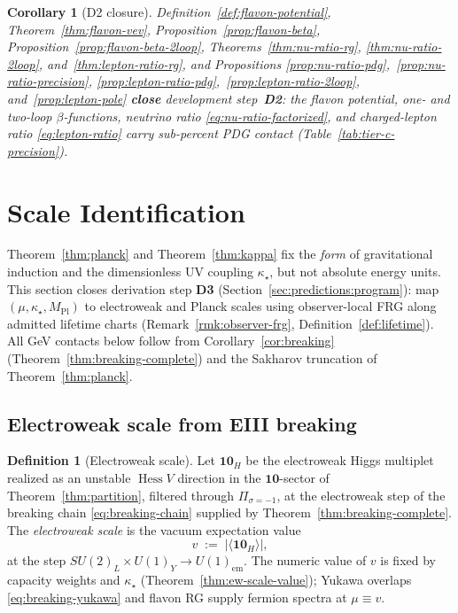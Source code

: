 \documentclass[aps,prd,onecolumn,amsmath,amssymb,nofootinbib,11pt]{revtex4-2}
\numberwithin{equation}{section}
\theoremstyle{plain}
\newtheorem{corollary}[theorem]{Corollary}
\theoremstyle{definition}
\newtheorem{definition}[theorem]{Definition}
\theoremstyle{remark}
\newcommand{\MPl}{M_{\mathrm{Pl}}}
\newcommand{\Hess}{\operatorname{Hess}}
\begin{document}
\begin{corollary}[D2 closure]\label{cor:flavon-d2}
Definition~\ref{def:flavon-potential}, Theorem~\ref{thm:flavon-vev},
Proposition~\ref{prop:flavon-beta},
Proposition~\ref{prop:flavon-beta-2loop}, Theorems~\ref{thm:nu-ratio-rg},
\ref{thm:nu-ratio-2loop}, and~\ref{thm:lepton-ratio-rg}, and Propositions
\ref{prop:nu-ratio-pdg},~\ref{prop:nu-ratio-precision},
\ref{prop:lepton-ratio-pdg},~\ref{prop:lepton-ratio-2loop},
and~\ref{prop:lepton-pole}
\textbf{close} development step~\textbf{D2}: the flavon potential,
one- and two-loop $\beta$-functions, neutrino ratio
\eqref{eq:nu-ratio-factorized}, and charged-lepton ratio
\eqref{eq:lepton-ratio} carry sub-percent PDG contact
(Table~\ref{tab:tier-c-precision}).
\end{corollary}%
\section{Scale Identification}
\label{sec:scales}

Theorem~\ref{thm:planck} and Theorem~\ref{thm:kappa} fix the \emph{form} of
gravitational induction and the dimensionless UV coupling $\kappa_\star$, but
not absolute energy units. This section closes derivation step \textbf{D3}
(Section~\ref{sec:predictions:program}): map $(\mu,\kappa_\star,\MPl)$ to
electroweak and Planck scales using observer-local FRG along admitted lifetime
charts (Remark~\ref{rmk:observer-frg}, Definition~\ref{def:lifetime}). All
GeV contacts below follow from Corollary~\ref{cor:breaking}
(Theorem~\ref{thm:breaking-complete}) and the Sakharov truncation of
Theorem~\ref{thm:planck}.

\subsection{Electroweak scale from EIII breaking}
\label{sec:scales:ew}

\begin{definition}[Electroweak scale]\label{def:ew-scale}
Let $\mathbf{10}_H$ be the electroweak Higgs multiplet realized as an
unstable $\Hess V$ direction in the $\mathbf{10}$-sector of
Theorem~\ref{thm:partition}, filtered through $\Pi_{\sigma=-1}$, at the
electroweak step of the breaking chain \eqref{eq:breaking-chain} supplied by
Theorem~\ref{thm:breaking-complete}. The \emph{electroweak scale} is the
vacuum expectation value
\begin{equation}\label{eq:ew-vev}
  v \;:=\; \bigl|\langle \mathbf{10}_H\rangle\bigr|,
\end{equation}
at the step $SU(2)_L\times U(1)_Y\to U(1)_{\mathrm{em}}$. The numeric value
of $v$ is fixed by capacity weights and $\kappa_\star$
(Theorem~\ref{thm:ew-scale-value}); Yukawa overlaps
\eqref{eq:breaking-yukawa} and flavon RG supply fermion spectra at $\mu\equiv v$.
\end{definition}
\end{document}
